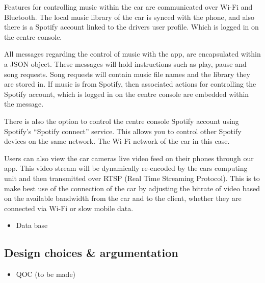 \documentclass{article}
\begin{document}
Features for controlling music within the car are communicated over Wi-Fi and Bluetooth. The local music library of the car is synced with the phone, and also there is a Spotify account linked to the drivers user profile. Which is logged in on the centre console.

All messages regarding the control of music with the app, are encapsulated within a JSON object. These messages will hold instructions such as play, pause and song requests. Song requests will contain music file names and the library they are stored in.
If music is from Spotify, then associated actions for controlling the Spotify account, which is logged in on the centre console are embedded within the message.

There is also the option to control the centre console Spotify account using Spotify's ``Spotify connect'' service. This allows you to control other Spotify devices on the same network. The Wi-Fi network of the car in this case.

Users can also view the car cameras live video feed on their phones through our app. This video stream will be dynamically re-encoded by the cars computing unit and then transmitted over RTSP (Real Time Streaming Protocol). This is to make best use of the connection of the car by adjusting the bitrate of video based on the available bandwidth from the car and to the client, whether they are connected via Wi-Fi or slow mobile data.
\begin{itemize}
  \item Data base
\end{itemize}

\subsection{Design choices \& argumentation}\label{ssec:app-design}
\begin{itemize}
  \item QOC (to be made)
\end{itemize}
\end{document}
